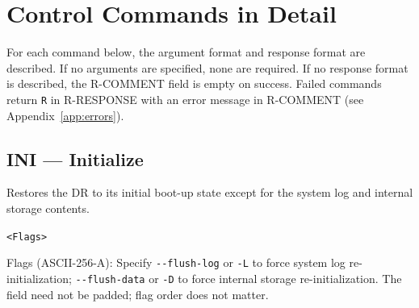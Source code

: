 
\section{Control Commands in Detail}
\label{sec:commands-detail}

For each command below, the argument format and response format are described.
If no arguments are specified, none are required.  If no response format is
described, the R-COMMENT field is empty on success.  Failed commands return
\texttt{R} in R-RESPONSE with an error message in R-COMMENT
(see Appendix~\ref{app:errors}).

\subsection{INI --- Initialize}
\label{cmd:ini}
\begin{description}[style=nextline]
    \item[Description:]
        Restores the DR to its initial boot-up state except for the system log
        and internal storage contents.
    \item[Argument Format:] \texttt{<Flags>}
    \item[Argument:]
        Flags (ASCII-256-A): Specify \texttt{-{}-flush-log} or \texttt{-L} to
        force system log re-initialization; \texttt{-{}-flush-data} or
        \texttt{-D} to force internal storage re-initialization.  The field
        need not be padded; flag order does not matter.
\end{description}

